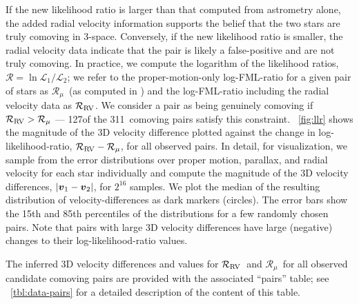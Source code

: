 \documentclass[modern, letterpaper]{aastex61}
\newcommand{\llrold}{\ensuremath{\mathcal{R}_\mu}}
\newcommand{\llrnew}{\ensuremath{\mathcal{R}_{\rm RV}}}
\newcommand{\npairsobs}{311}
\newcommand{\ncomoving}{127}
\begin{document}
If the new likelihood ratio is larger than that computed from astrometry alone,
the added radial velocity information supports the belief that the two stars are
truly comoving in 3-space.
Conversely, if the new likelihood ratio is smaller, the radial velocity data
indicate that the pair is likely a false-positive and are not truly comoving.
In practice, we compute the logarithm of the likelihood ratios,
$\mathcal{R} = \ln \mathcal{L}_1/\mathcal{L}_2$; we refer to the
proper-motion-only log-FML-ratio for a given pair of stars as
\llrold\ (as computed in \citealt{Oh:2017}) and the log-FML-ratio including the
radial velocity data as \llrnew.
We consider a pair as being genuinely comoving if $\llrnew > \llrold$ ---
\ncomoving of the \npairsobs\ comoving pairs satisfy this constraint.
\figurename~\ref{fig:llr} shows the magnitude of the 3D velocity difference
plotted against the change in log-likelihood-ratio, $\llrnew - \llrold$, for all
observed pairs.
In detail, for visualization, we sample from the error distributions over proper
motion, parallax, and radial velocity for each star individually and compute the
magnitude of the 3D velocity differences, $|\boldsymbol{v}_1-\boldsymbol{v}_2|$, for $2^{16}$
samples.
We plot the median of the resulting distribution of velocity-differences as
dark markers (circles).
The error bars show the 15th and 85th percentiles of the distributions for a few
randomly chosen pairs.
Note that pairs with large 3D velocity differences have large (negative) changes
to their log-likelihood-ratio values.

The inferred 3D velocity differences and values for \llrnew\ and \llrold\ for
all observed candidate comoving pairs are provided with the associated ``pairs''
table; see \tablename~\ref{tbl:data-pairs} for a detailed description of the
content of this table.
\end{document}
